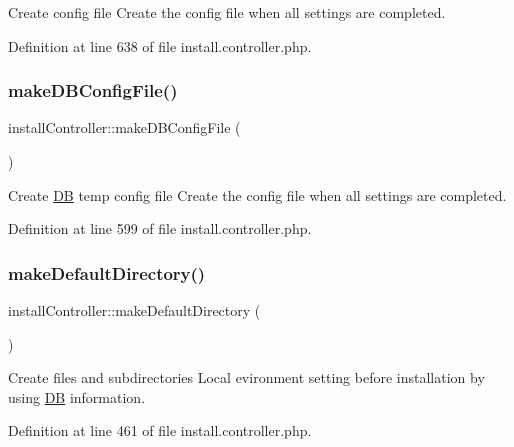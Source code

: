 Create config file Create the config file when all settings are completed. 



Definition at line 638 of file install.\+controller.\+php.

\mbox{\label{classinstallController_a65277eeb03f9762ae58dab7570e5310c}} 
\subsubsection{\texorpdfstring{make\+D\+B\+Config\+File()}{makeDBConfigFile()}}
{\footnotesize\ttfamily install\+Controller\+::make\+D\+B\+Config\+File (\begin{DoxyParamCaption}{ }\end{DoxyParamCaption})}



Create \hyperlink{classDB}{DB} temp config file Create the config file when all settings are completed. 



Definition at line 599 of file install.\+controller.\+php.

\mbox{\label{classinstallController_a5503f7ef0615cbd6b11a6ef4ae13c2c9}} 
\subsubsection{\texorpdfstring{make\+Default\+Directory()}{makeDefaultDirectory()}}
{\footnotesize\ttfamily install\+Controller\+::make\+Default\+Directory (\begin{DoxyParamCaption}{ }\end{DoxyParamCaption})}



Create files and subdirectories Local evironment setting before installation by using \hyperlink{classDB}{DB} information. 



Definition at line 461 of file install.\+controller.\+php.

